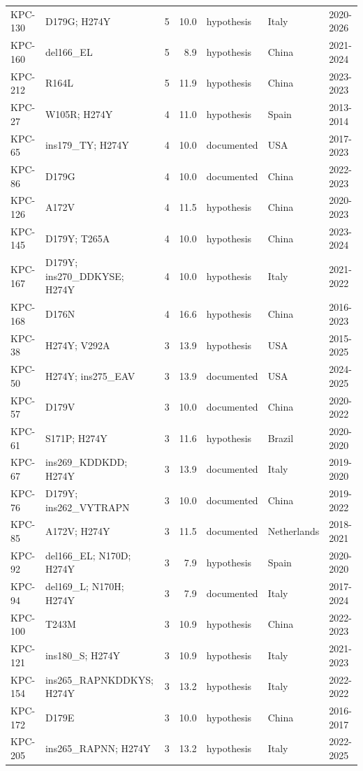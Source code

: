 \begin{longtable}{@{}l p{4.6cm} r r l l l@{}}
KPC-130 & D179G; H274Y & 5 & 10.0 & hypothesis & Italy & 2020-2026 \\
KPC-160 & del166\_EL & 5 & 8.9 & hypothesis & China & 2021-2024 \\
KPC-212 & R164L & 5 & 11.9 & hypothesis & China & 2023-2023 \\
KPC-27 & W105R; H274Y & 4 & 11.0 & hypothesis & Spain & 2013-2014 \\
KPC-65 & ins179\_TY; H274Y & 4 & 10.0 & documented & USA & 2017-2023 \\
KPC-86 & D179G & 4 & 10.0 & documented & China & 2022-2023 \\
KPC-126 & A172V & 4 & 11.5 & hypothesis & China & 2020-2023 \\
KPC-145 & D179Y; T265A & 4 & 10.0 & hypothesis & China & 2023-2024 \\
KPC-167 & D179Y; ins270\_DDKYSE; H274Y & 4 & 10.0 & hypothesis & Italy & 2021-2022 \\
KPC-168 & D176N & 4 & 16.6 & hypothesis & China & 2016-2023 \\
KPC-38 & H274Y; V292A & 3 & 13.9 & hypothesis & USA & 2015-2025 \\
KPC-50 & H274Y; ins275\_EAV & 3 & 13.9 & documented & USA & 2024-2025 \\
KPC-57 & D179V & 3 & 10.0 & documented & China & 2020-2022 \\
KPC-61 & S171P; H274Y & 3 & 11.6 & hypothesis & Brazil & 2020-2020 \\
KPC-67 & ins269\_KDDKDD; H274Y & 3 & 13.9 & documented & Italy & 2019-2020 \\
KPC-76 & D179Y; ins262\_VYTRAPN & 3 & 10.0 & documented & China & 2019-2022 \\
KPC-85 & A172V; H274Y & 3 & 11.5 & documented & Netherlands & 2018-2021 \\
KPC-92 & del166\_EL; N170D; H274Y & 3 & 7.9 & hypothesis & Spain & 2020-2020 \\
KPC-94 & del169\_L; N170H; H274Y & 3 & 7.9 & documented & Italy & 2017-2024 \\
KPC-100 & T243M & 3 & 10.9 & hypothesis & China & 2022-2023 \\
KPC-121 & ins180\_S; H274Y & 3 & 10.9 & hypothesis & Italy & 2021-2023 \\
KPC-154 & ins265\_RAPNKDDKYS; H274Y & 3 & 13.2 & hypothesis & Italy & 2022-2022 \\
KPC-172 & D179E & 3 & 10.0 & hypothesis & China & 2016-2017 \\
KPC-205 & ins265\_RAPNN; H274Y & 3 & 13.2 & hypothesis & Italy & 2022-2025 \\

\end{longtable}
